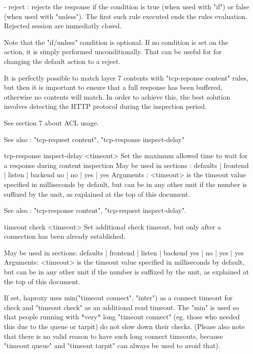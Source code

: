     - reject :
        rejects the response if the condition is true (when used with "if")
        or false (when used with "unless"). The first such rule executed ends
        the rules evaluation. Rejected session are immediatly closed.

  Note that the "if/unless" condition is optional. If no condition is set on
  the action, it is simply performed unconditionally. That can be useful for
  for changing the default action to a reject.

  It is perfectly possible to match layer 7 contents with "tcp-reponse content"
  rules, but then it is important to ensure that a full response has been
  buffered, otherwise no contents will match. In order to achieve this, the
  best solution involves detecting the HTTP protocol during the inspection
  period.

  See section 7 about ACL usage.

  See also : "tcp-request content", "tcp-response inspect-delay"


tcp-response inspect-delay <timeout>
  Set the maximum allowed time to wait for a response during content inspection
  May be used in sections :   defaults | frontend | listen | backend
                                 no    |    no    |   yes  |   yes
  Arguments :
    <timeout> is the timeout value specified in milliseconds by default, but
              can be in any other unit if the number is suffixed by the unit,
              as explained at the top of this document.

  See also : "tcp-response content", "tcp-request inspect-delay".


timeout check <timeout>
  Set additional check timeout, but only after a connection has been already
  established.

  May be used in sections:    defaults | frontend | listen | backend
                                 yes   |    no    |   yes  |   yes
  Arguments:
    <timeout> is the timeout value specified in milliseconds by default, but
              can be in any other unit if the number is suffixed by the unit,
              as explained at the top of this document.

  If set, haproxy uses min("timeout connect", "inter") as a connect timeout
  for check and "timeout check" as an additional read timeout. The "min" is
  used so that people running with *very* long "timeout connect" (eg. those
  who needed this due to the queue or tarpit) do not slow down their checks.
  (Please also note that there is no valid reason to have such long connect
  timeouts, because "timeout queue" and "timeout tarpit" can always be used to
  avoid that).

